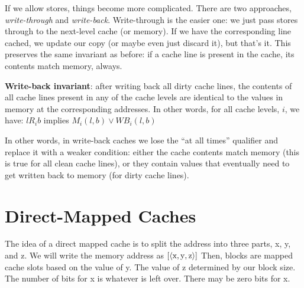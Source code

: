If we allow stores, things become more complicated.
There are two approaches, \textit{write-through} and 
\textit{write-back}. Write-through is the easier one:
we just pass stores through to the next-level cache (or memory).
If we have the corresponding line cached, we update our copy
(or maybe even just discard it), but that’s it. This preserves the same
invariant as before: if a cache line is present in the cache,
its contents match memory, always. 


\textbf{Write-back invariant}: after writing back all dirty cache lines, 
the contents of all cache lines present in any of the cache levels 
are identical to the values in memory at the corresponding addresses.
In other words, for all cache levels, $i$, we have:
$l R_i b$ implies $M_i(l,b) \vee WB_i(l,b)$

In other words, in write-back caches we lose the “at all times” qualifier
and replace it with a weaker condition: either the cache contents match memory
(this is true for all clean cache lines), or they contain values that eventually need
to get written back to memory (for dirty cache lines).



\section{Direct-Mapped Caches}



\frmrule

The idea of a direct mapped cache is to split the address into three parts, 
x, y, and z. We will write the memory address as 
$[\langle \text{\lstinline{x}},\text{\lstinline{y}},\text{\lstinline{z}} \rangle]$
Then, blocks are mapped cache slots based on the 
value of y. The value of z determined by our block size. 
The number of bits for x is whatever is left over. There may be zero bits for x.

